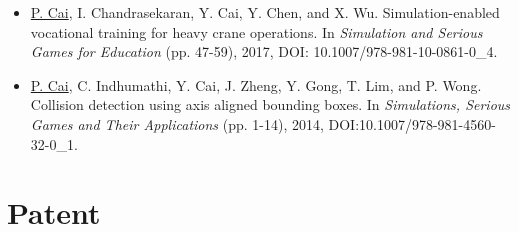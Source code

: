 \documentclass[10pt,letterpaper,sans]{moderncv}        %
\begin{document}
{
\begin{itemize}
\item \underline{P. Cai}, I. Chandrasekaran, Y. Cai, Y. Chen, and X. Wu. Simulation-enabled vocational training for heavy crane operations. In \textit{Simulation and Serious Games for Education} (pp. 47-59), 2017, DOI: 10.1007/978-981-10-0861-0\_4.
\item \underline{P. Cai}, C. Indhumathi, Y. Cai, J. Zheng, Y. Gong, T. Lim, and P. Wong. Collision detection  using  axis  aligned  bounding  boxes. In \textit{Simulations, Serious Games and Their Applications} (pp. 1-14), 2014, DOI:10.1007/978-981-4560-32-0\_1.%
\end{itemize}
}

\section{Patent}

\end{document}
